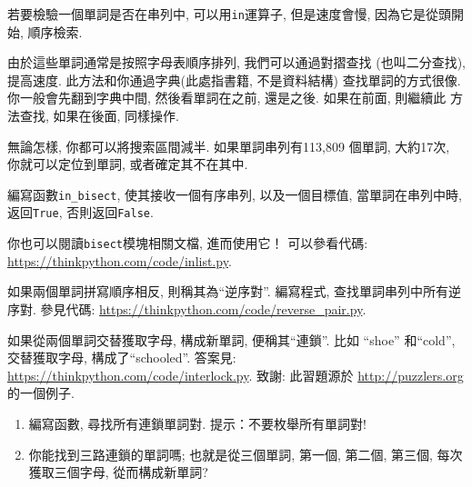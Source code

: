 \documentclass[10pt]{book}
\begin{document}
\begin{exercise}
\label{wordlist1}
\label{bisection}
若要檢驗一個單詞是否在串列中, 可以用{\tt in}運算子, 
但是速度會慢, 因為它是從頭開始, 順序檢索. 

由於這些單詞通常是按照字母表順序排列, 我們可以通過對摺查找
(也叫二分查找), 提高速度. 此方法和你通過字典(此處指書籍, 不是資料結構)
查找單詞的方式很像. 
你一般會先翻到字典中間, 然後看單詞在之前, 還是之後. 如果在前面, 則繼續此
方法查找, 如果在後面, 同樣操作. 

無論怎樣, 你都可以將搜索區間減半. 
如果單詞串列有113,809 個單詞, 大約17次, 你就可以定位到單詞, 
或者確定其不在其中.

編寫函數\verb"in_bisect",  使其接收一個有序串列, 以及一個目標值, 
當單詞在串列中時, 返回{\tt True},  否則返回{\tt False}. 

你也可以閱讀{\tt bisect}模塊相關文檔, 進而使用它！
可以參看代碼: \url{https://thinkpython.com/code/inlist.py}.

\end{exercise}

\begin{exercise}

如果兩個單詞拼寫順序相反, 則稱其為``逆序對''.
編寫程式, 查找單詞串列中所有逆序對.
參見代碼: \url{https://thinkpython.com/code/reverse_pair.py}.

\end{exercise}

\begin{exercise}
如果從兩個單詞交替獲取字母, 構成新單詞, 便稱其``連鎖''. 
比如 ``shoe'' 和``cold'', 交替獲取字母, 構成了``schooled''. 
答案見: \url{https://thinkpython.com/code/interlock.py}.
致謝: 此習題源於 \url{http://puzzlers.org} 的一個例子.

\begin{enumerate}

\item 編寫函數, 尋找所有連鎖單詞對. 提示：不要枚舉所有單詞對!

\item 你能找到三路連鎖的單詞嗎; 也就是從三個單詞, 第一個, 第二個, 第三個, 
每次獲取三個字母, 從而構成新單詞?

\end{enumerate}
\end{exercise}
\end{document}
